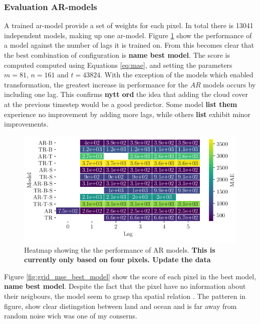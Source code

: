 \subsubsection{Evaluation AR-models}
A trained \acrshort{ar}-model provide a set of weights for each pixel. In total there is 13041 independent models, making up one \acrshort{ar}-model. Figure \ref{fig:results_ar_models} show the performance of a model against the number of lags it is trained on. From this becomes clear that the best combination of configuration is \textbf{name best model}. The score is computed computed using Equations \eqref{eq:mae}, and setting the parameters $m = 81$, $n=161$ and $t=43824$. With the exception of the models which enabled transformation, the greatest increase in performance for the $AR$ models occurs by including one lag. This confirms \textbf{nytt ord} the idea that adding the cloud cover at the previous timestep would be a good predictor. Some model \textbf{list them} experience no improvement by adding more lags, while others \textbf{list} exhibit minor improvements.
\begin{figure}
    \centering
    \includegraphics{python_figs/heat_ar_model_score.png} %
    \caption{Heatmap showing the the performance of AR models. \textbf{This is currently only based on four pixels. Update the data}}
    \label{fig:results_ar_models}
\end{figure}
Figure \ref{fig:grid_mse_best_model} show the score of each pixel in the best model, \textbf{name best model}. Despite the fact that the pixel have no information about their neigbours, the model seem to grasp tha spatial relation . The patteren in figure, show clear distingstion between land and ocean and is far away from random noise wich was one of my conserns. 

